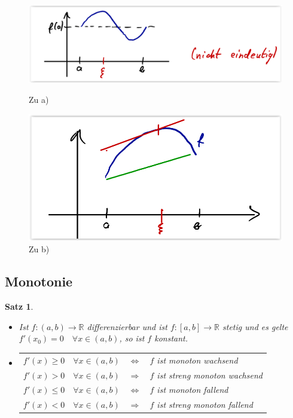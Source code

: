 \documentclass[12pt,a4paper]{article}%
\newtheorem{satz}{Satz}[section]
\numberwithin{equation}{section}
\newcommand{\R}{\mathbb{R}} %
\numberwithin{equation}{subsection}
\begin{document}
  \begin{figure}[H] 
		\centering
		\begin{minipage}{.5\textwidth}
		  \centering
		  \includegraphics[width=0.8\linewidth]{mws_rolle.png}
		  \caption{Zu a) \protect\cite{HM12}}
		  \label{fig:mws_rolle}
		\end{minipage}%
		\begin{minipage}{.5\textwidth}
		  \centering
		  \includegraphics[width=0.8\linewidth]{mws_1.png}
		  \caption{Zu b) \protect\cite{HM12}}
		  \label{fig:funkt_sinh}
		\end{minipage}
  \end{figure}
		
  \subsection{Monotonie}	
  \begin{satz}$\;$ \newline
  \vspace{-0.5cm}
    \begin{itemize}
      \item[a) ] Ist $f:(a,b)\rightarrow \R$ differenzierbar und ist $f:[a,b]\rightarrow \R$ stetig und es gelte $f'(x_0) = 0 \quad \forall x \in (a,b)$, so ist $f$ konstant.
      \item[b) ] 
      \begin{tabular}{l c l} 
        $f'(x) \geq 0 \quad \forall x \in (a,b)$ & $\Leftrightarrow$ & $f$ ist monoton wachsend \\
        $f'(x) > 0 \quad \forall x \in (a,b)$ & $\Rightarrow$ & $f$ ist streng monoton wachsend \\
        $f'(x) \leq 0 \quad \forall x \in (a,b)$ & $\Leftrightarrow$ & $f$ ist monoton fallend \\
        $f'(x) < 0 \quad \forall x \in (a,b)$ & $\Rightarrow$ & $f$ ist streng monoton fallend \\
      \end{tabular}
    \end{itemize}
  \end{satz}	
  
\end{document}
